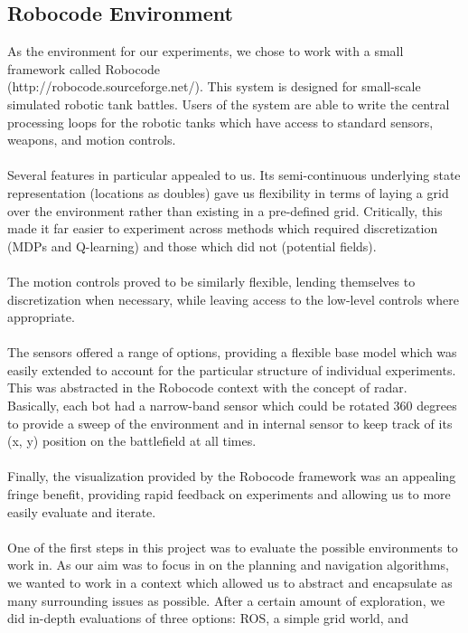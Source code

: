 \documentclass{aiaa-tc}%
\begin{document}
\subsection{Robocode Environment}

As the environment for our experiments, we chose to work with a small
framework called Robocode \\(http://robocode.sourceforge.net/). This system is designed for small-scale
simulated robotic tank battles. Users of the system are able to write
the central processing loops for the robotic tanks which have access to
standard sensors, weapons, and motion controls. \\ \\
Several features in particular appealed to us. Its semi-continuous underlying state
representation (locations as doubles) gave us flexibility in
terms of laying a grid over the environment rather than existing in a
pre-defined grid. Critically, this made it far easier to experiment
across methods which required discretization (MDPs and Q-learning) and
those which did not (potential fields). \\ \\
The motion controls proved to be similarly flexible, lending
themselves to discretization when necessary, while leaving access to
the low-level controls where appropriate. \\ \\
The sensors offered a range of options, providing a flexible base
model which was easily extended to account for the particular
structure of individual
experiments. This was abstracted in the Robocode context with the
concept of radar. Basically, each bot had a narrow-band sensor which could be rotated 360 degrees to provide a sweep of the environment and in internal sensor to keep track of its (x, y) position on the battlefield at all times. \\ \\
Finally, the visualization provided by the Robocode framework was an appealing fringe benefit, providing
rapid feedback on experiments and allowing us to more easily evaluate
and iterate. \\ \\
One of the first steps in this project was to evaluate the possible
environments to work in. As our aim was to focus in on the planning and navigation algorithms,
we wanted to work in a context which allowed us to abstract and
encapsulate as many
surrounding issues as possible. After a certain amount of exploration, we did
in-depth evaluations of three options: ROS, a simple grid world, and
\end{document}
